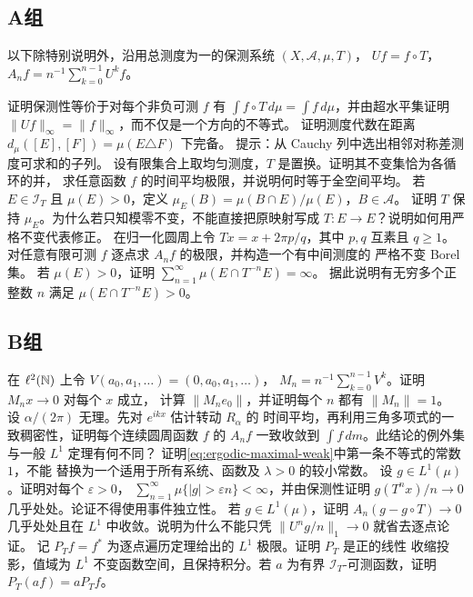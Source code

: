 \subsection*{A组}
以下除特别说明外，沿用总测度为一的保测系统 $(X,\mathcal A,\mu,T)$，
$U f=f\circ T$，$A_nf=n^{-1}\sum_{k=0}^{n-1}U^kf$。
\begin{enumerate}[label=\textbf{\thechapter.\arabic*.}]
证明保测性等价于对每个非负可测 $f$ 有
$\int f\circ T\,d\mu=\int f\,d\mu$，并由超水平集证明
$\|Uf\|_\infty=\|f\|_\infty$，而不仅是一个方向的不等式。
证明测度代数在距离 $d_\mu([E],[F])=\mu(E\triangle F)$ 下完备。
提示：从 Cauchy 列中选出相邻对称差测度可求和的子列。
设有限集合上取均匀测度，$T$ 是置换。证明其不变集恰为各循环的并，
求任意函数 $f$ 的时间平均极限，并说明何时等于全空间平均。
若 $E\in\mathcal I_T$ 且 $\mu(E)>0$，定义
$\mu_E(B)=\mu(B\cap E)/\mu(E)$，$B\in\mathcal A$。
证明 $T$ 保持 $\mu_E$。为什么若只知模零不变，不能直接把原映射写成
$T:E\to E$？说明如何用严格不变代表修正。
在归一化圆周上令 $Tx=x+2\pi p/q$，其中 $p,q$ 互素且 $q\ge1$。
对任意有限可测 $f$ 逐点求 $A_nf$ 的极限，并构造一个有中间测度的
严格不变 Borel 集。
若 $\mu(E)>0$，证明
$\sum_{n=1}^\infty\mu(E\cap T^{-n}E)=\infty$。
据此说明有无穷多个正整数 $n$ 满足 $\mu(E\cap T^{-n}E)>0$。
\end{enumerate}

\subsection*{B组}
\begin{enumerate}[label=\textbf{\thechapter.\arabic*.},resume]
在 $\ell^2(\mathbb{N})$ 上令 $V(a_0,a_1,\ldots)=(0,a_0,a_1,\ldots)$，
$M_n=n^{-1}\sum_{k=0}^{n-1}V^k$。证明 $M_nx\to0$ 对每个 $x$ 成立，
计算 $\|M_ne_0\|$，并证明每个 $n$ 都有 $\|M_n\|=1$。
设 $\alpha/(2\pi)$ 无理。先对 $e^{ikx}$ 估计转动 $R_\alpha$ 的
时间平均，再利用三角多项式的一致稠密性，证明每个连续圆周函数 $f$ 的
$A_nf$ 一致收敛到 $\int f\,dm$。此结论的例外集与一般 $L^1$ 定理有何不同？
证明\eqref{eq:ergodic-maximal-weak}中第一条不等式的常数 $1$，不能
替换为一个适用于所有系统、函数及 $\lambda>0$ 的较小常数。
设 $g\in L^1(\mu)$。证明对每个 $\varepsilon>0$，
$\sum_{n=1}^\infty\mu\{|g|>\varepsilon n\}<\infty$，并由保测性证明
$g(T^nx)/n\to0$ 几乎处处。论证不得使用事件独立性。
若 $g\in L^1(\mu)$，证明 $A_n(g-g\circ T)\to0$ 几乎处处且在 $L^1$
中收敛。说明为什么不能只凭 $\|U^ng/n\|_1\to0$ 就省去逐点论证。
记 $P_Tf=f^*$ 为逐点遍历定理给出的 $L^1$ 极限。证明 $P_T$ 是正的线性
收缩投影，值域为 $L^1$ 不变函数空间，且保持积分。若 $a$ 为有界
$\mathcal I_T$-可测函数，证明 $P_T(af)=aP_Tf$。
\end{enumerate}

